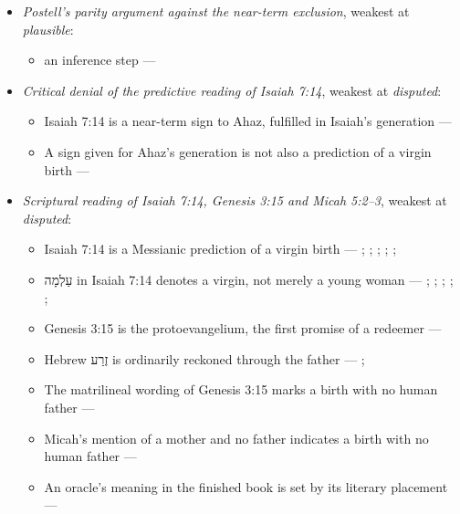 \documentclass[11pt]{article}
\begin{document}
\begin{itemize}
\item \emph{Postell's parity argument against the near-term exclusion}, weakest at \emph{plausible}:
\begin{itemize}
\item an inference step --- \cite[487--489]{postell-isaiah-messianic-2025}
\end{itemize}
\item \emph{Critical denial of the predictive reading of Isaiah 7:14}, weakest at \emph{disputed}:
\begin{itemize}
\item Isaiah 7:14 is a near-term sign to Ahaz, fulfilled in Isaiah's generation --- \cite{brown-birth-messiah-1993}
\item A sign given for Ahaz's generation is not also a prediction of a virgin birth --- \cite{brown-birth-messiah-1993}
\end{itemize}
\item \emph{Scriptural reading of Isaiah 7:14, Genesis 3:15 and Micah 5:2–3}, weakest at \emph{disputed}:
\begin{itemize}
\item Isaiah 7:14 is a Messianic prediction of a virgin birth --- \cite[ad loc. Isa 7:14]{motyer-isaiah-1993}; \cite[123]{motyer-context-content-1970}; \cite[12--14]{compton-immanuel-prophecy-2007}; \cite[66]{justin-dialogue-with-trypho-160}; \cite[III.21.6]{irenaeus-against-heresies-180}; \cite[I.35]{origen-against-celsus-248}
\item עַלְמָה in Isaiah 7:14 denotes a virgin, not merely a young woman --- \cite[ad loc. Isa 7:14]{motyer-isaiah-1993}; \cite[app. Isa 7:14]{bhs-1997}; \cite[1653--1654]{berry-virgin-birth-2003}; \cite[125]{motyer-context-content-1970}; \cite[7--8]{compton-immanuel-prophecy-2007}; \cite[I.32]{jerome-against-jovinianus-393}
\item Genesis 3:15 is the protoevangelium, the first promise of a redeemer --- \cite[9--10]{miravalle-meet-mary-2007}
\item Hebrew זֶרַע is ordinarily reckoned through the father --- \cite[9--10]{miravalle-meet-mary-2007}; \cite[app. Gen 3:15]{bhs-1997}
\item The matrilineal wording of Genesis 3:15 marks a birth with no human father --- \cite[9--10]{miravalle-meet-mary-2007}
\item Micah's mention of a mother and no father indicates a birth with no human father --- \cite[9--10]{miravalle-meet-mary-2007}
\item An oracle's meaning in the finished book is set by its literary placement --- \cite[483--486]{postell-isaiah-messianic-2025}

\end{itemize}
\end{itemize}
\end{document}

